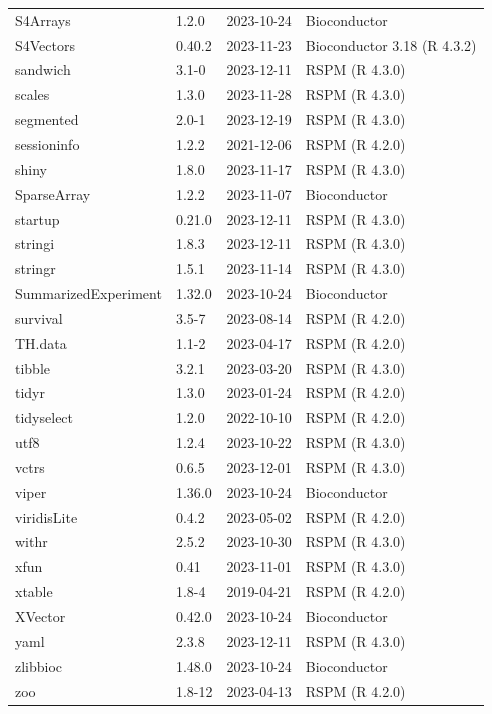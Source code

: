\documentclass[]{article}
\begin{document}
\begin{longtable}[t]{llll}
S4Arrays & 1.2.0 & 2023-10-24 & Bioconductor\\
\addlinespace
S4Vectors & 0.40.2 & 2023-11-23 & Bioconductor 3.18 (R 4.3.2)\\
sandwich & 3.1-0 & 2023-12-11 & RSPM (R 4.3.0)\\
scales & 1.3.0 & 2023-11-28 & RSPM (R 4.3.0)\\
segmented & 2.0-1 & 2023-12-19 & RSPM (R 4.3.0)\\
sessioninfo & 1.2.2 & 2021-12-06 & RSPM (R 4.2.0)\\
\addlinespace
shiny & 1.8.0 & 2023-11-17 & RSPM (R 4.3.0)\\
SparseArray & 1.2.2 & 2023-11-07 & Bioconductor\\
startup & 0.21.0 & 2023-12-11 & RSPM (R 4.3.0)\\
stringi & 1.8.3 & 2023-12-11 & RSPM (R 4.3.0)\\
stringr & 1.5.1 & 2023-11-14 & RSPM (R 4.3.0)\\
\addlinespace
SummarizedExperiment & 1.32.0 & 2023-10-24 & Bioconductor\\
survival & 3.5-7 & 2023-08-14 & RSPM (R 4.2.0)\\
TH.data & 1.1-2 & 2023-04-17 & RSPM (R 4.2.0)\\
tibble & 3.2.1 & 2023-03-20 & RSPM (R 4.3.0)\\
tidyr & 1.3.0 & 2023-01-24 & RSPM (R 4.2.0)\\
\addlinespace
tidyselect & 1.2.0 & 2022-10-10 & RSPM (R 4.2.0)\\
utf8 & 1.2.4 & 2023-10-22 & RSPM (R 4.3.0)\\
vctrs & 0.6.5 & 2023-12-01 & RSPM (R 4.3.0)\\
viper & 1.36.0 & 2023-10-24 & Bioconductor\\
viridisLite & 0.4.2 & 2023-05-02 & RSPM (R 4.2.0)\\
\addlinespace
withr & 2.5.2 & 2023-10-30 & RSPM (R 4.3.0)\\
xfun & 0.41 & 2023-11-01 & RSPM (R 4.3.0)\\
xtable & 1.8-4 & 2019-04-21 & RSPM (R 4.2.0)\\
XVector & 0.42.0 & 2023-10-24 & Bioconductor\\
yaml & 2.3.8 & 2023-12-11 & RSPM (R 4.3.0)\\
\addlinespace
zlibbioc & 1.48.0 & 2023-10-24 & Bioconductor\\
zoo & 1.8-12 & 2023-04-13 & RSPM (R 4.2.0)\\
\bottomrule
\end{longtable}
\end{document}
